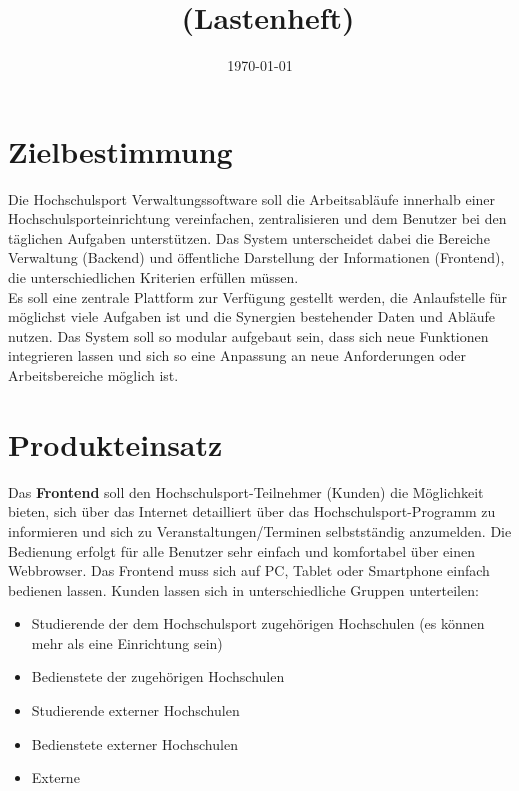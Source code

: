 \documentclass[a4paper,12pt]{article}
\title{\projektName~(Lastenheft)}
\author{\authorName}
\date{\today}
\begin{document}
 \setcounter{page}{2}
 \tableofcontents          %
 \clearpage
 
\section{Zielbestimmung}
Die Hochschulsport Verwaltungssoftware soll die Arbeitsabläufe innerhalb einer Hochschulsporteinrichtung vereinfachen, zentralisieren und dem Benutzer bei den täglichen Aufgaben unterstützen. Das System unterscheidet dabei die Bereiche Verwaltung (Backend) und öffentliche Darstellung der Informationen (Frontend), die unterschiedlichen Kriterien erfüllen müssen. \\
Es soll eine zentrale Plattform zur Verfügung gestellt werden, die Anlaufstelle für möglichst viele Aufgaben ist und die Synergien bestehender Daten und Abläufe nutzen. Das System soll so modular aufgebaut sein, dass sich neue Funktionen integrieren lassen und sich so eine Anpassung an neue Anforderungen oder Arbeitsbereiche möglich ist.\\



\section{Produkteinsatz}
Das \textbf{Frontend} soll den Hochschulsport-Teilnehmer (Kunden) die Möglichkeit bieten, sich über das Internet detailliert über das Hochschulsport-Programm zu informieren und sich zu Veranstaltungen/Terminen selbstständig anzumelden. Die Bedienung erfolgt für alle Benutzer sehr einfach und komfortabel über einen Webbrowser. Das Frontend muss sich auf PC, Tablet oder Smartphone einfach bedienen lassen.
Kunden lassen sich in unterschiedliche Gruppen unterteilen:
\begin{itemize}
\item Studierende der dem Hochschulsport zugehörigen Hochschulen (es können mehr als eine Einrichtung sein)
\item Bedienstete der zugehörigen Hochschulen
\item Studierende externer Hochschulen
\item Bedienstete externer Hochschulen
\item Externe
\end{itemize} 
\end{document}
